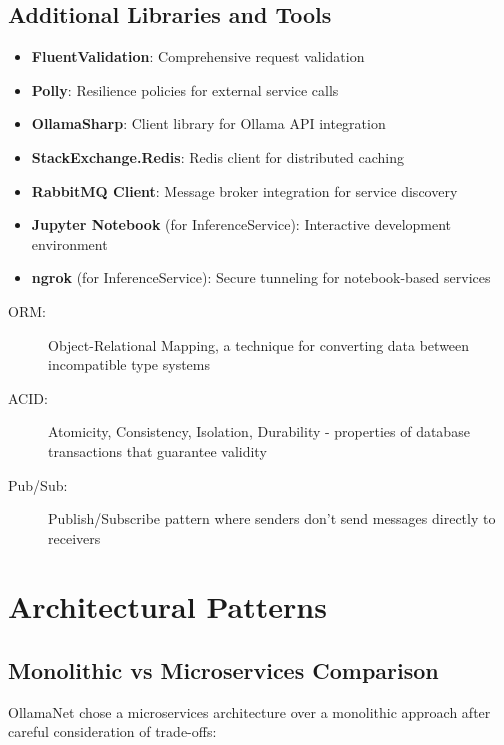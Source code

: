 \subsection*{Additional Libraries and Tools}
\begin{itemize}
    \item \textbf{FluentValidation}: Comprehensive request validation
    \item \textbf{Polly}: Resilience policies for external service calls
    \item \textbf{OllamaSharp}: Client library for Ollama API integration
    \item \textbf{StackExchange.Redis}: Redis client for distributed caching
    \item \textbf{RabbitMQ Client}: Message broker integration for service discovery
    \item \textbf{Jupyter Notebook} (for InferenceService): Interactive development environment
    \item \textbf{ngrok} (for InferenceService): Secure tunneling for notebook-based services
\end{itemize}

\begin{terminology}
\begin{description}
    \item[ORM:] Object-Relational Mapping, a technique for converting data between incompatible type systems
    \item[ACID:] Atomicity, Consistency, Isolation, Durability - properties of database transactions that guarantee validity
    \item[Pub/Sub:] Publish/Subscribe pattern where senders don't send messages directly to receivers
\end{description}
\end{terminology}

\section{Architectural Patterns}

\subsection{Monolithic vs Microservices Comparison}

OllamaNet chose a microservices architecture over a monolithic approach after careful consideration of trade-offs:

